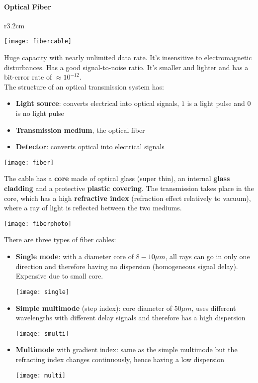 \paragraph{Optical Fiber}
\begin{wrapfigure}[5]{r}{3.2cm}
	\vspace{-0.5cm}
	\begin{center}
		\texttt{[image: fibercable]}
	\end{center}
\end{wrapfigure}
Huge capacity with nearly unlimited data rate. It's insensitive to electromagnetic disturbances. Has a good signal-to-noise ratio. It's smaller and lighter and has a bit-error rate of $\approx 10^{-12}$.\\
The structure of an optical transmission system has:
\begin{itemize}
	\item \textbf{Light source}: converts electrical into optical signals, $1$ is a light pulse and $0$ is no light pulse
	\item \textbf{Transmission medium}, the optical fiber
	\item \textbf{Detector}: converts optical into electrical signals
\end{itemize}
\begin{center}
	\texttt{[image: fiber]}
\end{center}
The cable has a \textbf{core} made of optical glass (super thin), an internal \textbf{glass cladding} and a protective \textbf{plastic covering}. The transmission takes place in the core, which has a high \textbf{refractive index} (refraction effect relatively to vacuum), where a ray of light is reflected between the two mediums.
\begin{center}
	\texttt{[image: fiberphoto]}
\end{center}
There are three types of fiber cables:
\begin{itemize}
	\item \textbf{Single mode}: with a diameter core of $8-10\mu m$, all rays can go in only one direction and therefore having no dispersion (homogeneous signal delay). Expensive due to small core.
	\begin{center}
		\texttt{[image: single]}
	\end{center}
	\item \textbf{Simple multimode} (step index): core diameter of $50\mu m$, uses different wavelengths with different delay signals and therefore has a high dispersion
	\begin{center}
		\texttt{[image: smulti]}
	\end{center}
	\newpage
	\item \textbf{Multimode} with gradient index: same as the simple multimode but the refracting index changes continuously, hence having a low dispersion
	\begin{center}
		\texttt{[image: multi]}
	\end{center}
\end{itemize}

